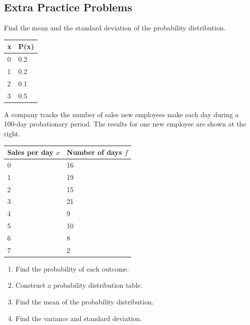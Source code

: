 \hypertarget{extra-practice-problems}{%
\subsection{Extra Practice Problems}\label{extra-practice-problems}}

\begin{exercise}

Find the mean and the standard deviation of the probability
distribution.

\begin{tabular}{ll}
\toprule
x & P(x) \\
\midrule
0 & 0.2 \\
1 & 0.2 \\
2 & 0.1 \\
3 & 0.5 \\
\bottomrule
\end{tabular}

\end{exercise}

\begin{exercise}

A company tracks the number of sales new employees make each day during
a 100-day probationary period. The results for one new employee are
shown at the right.

\begin{tabular}{@{}ll@{}}
  \toprule
  Sales per day \(x\) & Number of days \(f\) \\
  \midrule
  0 & 16 \\
  1 & 19 \\
  2 & 15 \\
  3 & 21 \\
  4 & 9 \\
  5 & 10 \\
  6 & 8 \\
  7 & 2 \\
  \bottomrule
  \end{tabular}

\begin{enumerate}
\item
  Find the probability of each outcome.
\item
  Construct a probability distribution table.
\item
  Find the mean of the probability distribution.
\item
  Find the variance and standard deviation.
\end{enumerate}

\end{exercise}

